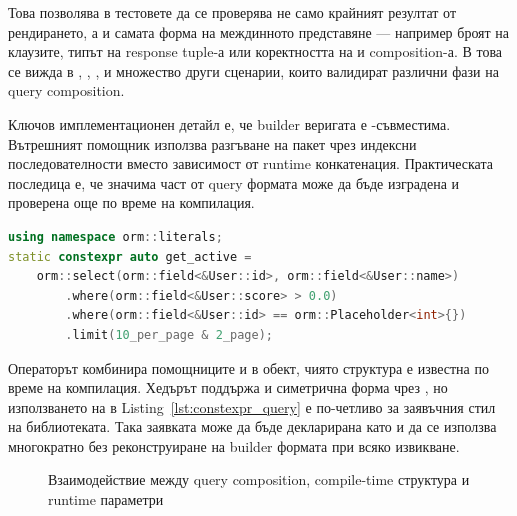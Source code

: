 Това позволява в тестовете да се проверява не само крайният резултат от рендирането, а и самата форма на междинното представяне --- например броят на  клаузите, типът на response tuple-а или коректността на  и  composition-а. В  това се вижда в , , ,  и множество други сценарии, които валидират различни фази на query composition.

Ключов имплементационен детайл е, че builder веригата е -съвместима. Вътрешният помощник  използва разгъване на пакет чрез индексни последователности вместо зависимост от runtime конкатенация. Практическата последица е, че значима част от query формата може да бъде изградена и проверена още по време на компилация.

\begin{lstlisting}[language=C++,caption={Query обект деклариран като compile-time константа},label={lst:constexpr_query}]
using namespace orm::literals;
static constexpr auto get_active =
    orm::select(orm::field<&User::id>, orm::field<&User::name>)
        .where(orm::field<&User::score> > 0.0)
        .where(orm::field<&User::id> == orm::Placeholder<int>{})
        .limit(10_per_page & 2_page);
\end{lstlisting}

Операторът \code{\&} комбинира помощниците  и  в  обект, чиято структура е известна по време на компилация. Хедърът  поддържа и симетрична форма чрез \code{*}, но използването на \code{\&} в Listing~\ref{lst:constexpr_query} е по-четливо за заявъчния стил на библиотеката. Така заявката може да бъде декларирана като  и да се използва многократно без реконструиране на builder формата при всяко извикване.

\begin{figure}[H]
\centering
{}
\caption{Взаимодействие между query composition, compile-time структура и runtime параметри}
\label{fig:query_composition_execution}
\end{figure}

